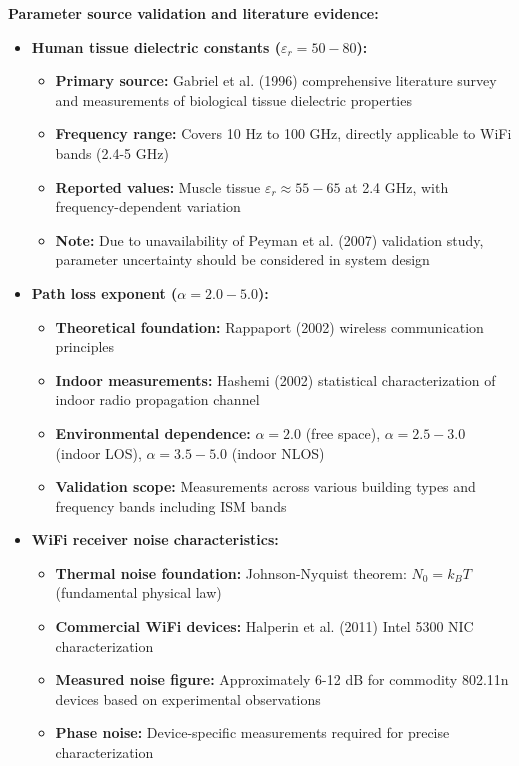 \documentclass[12pt,a4paper]{article}
\begin{document}
\textbf{Parameter source validation and literature evidence:}
\begin{itemize}
\item \textbf{Human tissue dielectric constants ($\varepsilon_r = 50-80$):}
\begin{itemize}
\item \textbf{Primary source:} Gabriel et al. (1996) \cite{gabriel1996dielectric} comprehensive literature survey and measurements of biological tissue dielectric properties
\item \textbf{Frequency range:} Covers 10 Hz to 100 GHz, directly applicable to WiFi bands (2.4-5 GHz)
\item \textbf{Reported values:} Muscle tissue $\varepsilon_r \approx 55-65$ at 2.4 GHz, with frequency-dependent variation
\item \textbf{Note:} Due to unavailability of Peyman et al. (2007) validation study, parameter uncertainty should be considered in system design
\end{itemize}
\item \textbf{Path loss exponent ($\alpha = 2.0-5.0$):}
\begin{itemize}
\item \textbf{Theoretical foundation:} Rappaport (2002) \cite{rappaport2002wireless} wireless communication principles
\item \textbf{Indoor measurements:} Hashemi (2002) \cite{hashemi2002indoor} statistical characterization of indoor radio propagation channel
\item \textbf{Environmental dependence:} $\alpha = 2.0$ (free space), $\alpha = 2.5-3.0$ (indoor LOS), $\alpha = 3.5-5.0$ (indoor NLOS)
\item \textbf{Validation scope:} Measurements across various building types and frequency bands including ISM bands
\end{itemize}
\item \textbf{WiFi receiver noise characteristics:}
\begin{itemize}
\item \textbf{Thermal noise foundation:} Johnson-Nyquist theorem: $N_0 = k_B T$ (fundamental physical law)
\item \textbf{Commercial WiFi devices:} Halperin et al. (2011) \cite{halperin2011tool} Intel 5300 NIC characterization
\item \textbf{Measured noise figure:} Approximately 6-12 dB for commodity 802.11n devices based on experimental observations
\item \textbf{Phase noise:} Device-specific measurements required for precise characterization

\end{itemize}
\end{itemize}
\end{document}
